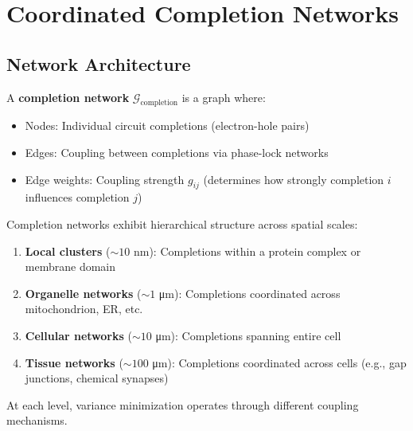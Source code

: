 \section{Coordinated Completion Networks}

\subsection{Network Architecture}

\begin{definition}
\label{def:completion_network}
A \textbf{completion network} $\mathcal{G}_{\text{completion}}$ is a graph where:
\begin{itemize}
\item Nodes: Individual circuit completions (electron-hole pairs)
\item Edges: Coupling between completions via phase-lock networks
\item Edge weights: Coupling strength $g_{ij}$ (determines how strongly completion $i$ influences completion $j$)
\end{itemize}
\end{definition}

\begin{theorem}
\label{thm:hierarchical_completion}
Completion networks exhibit hierarchical structure across spatial scales:
\begin{enumerate}
\item \textbf{Local clusters} ($\sim 10$ nm): Completions within a protein complex or membrane domain
\item \textbf{Organelle networks} ($\sim 1$ μm): Completions coordinated across mitochondrion, ER, etc.
\item \textbf{Cellular networks} ($\sim 10$ μm): Completions spanning entire cell
\item \textbf{Tissue networks} ($\sim 100$ μm): Completions coordinated across cells (e.g., gap junctions, chemical synapses)
\end{enumerate}

At each level, variance minimization operates through different coupling mechanisms.
\end{theorem}

